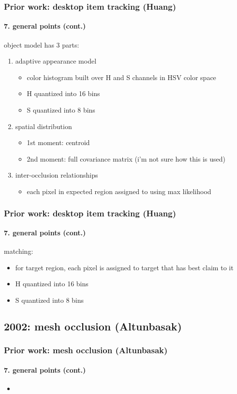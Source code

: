 \begin{frame}
\frametitle{Prior work: desktop item tracking (Huang)}
\framesubtitle{7. general points (cont.)}
\mypagenum
{}
	object model has 3 parts:
	\begin{enumerate}
		\item adaptive appearance model
			\begin{itemize}
				\item color histogram built over H and S channels in HSV color space
				\item H quantized into 16 bins
				\item S quantized into 8 bins
			\end{itemize}
		\item spatial distribution
			\begin{itemize}
				\item 1st moment: centroid
				\item 2nd moment: full covariance matrix (i'm not sure how this is used)
			\end{itemize}	
		\item inter-occlusion relationships
			\begin{itemize}
				\item each pixel in expected region assigned to  using max likelihood
			\end{itemize}	
	\end{enumerate}
\end{frame}




\begin{frame}
\frametitle{Prior work: desktop item tracking (Huang)}
\framesubtitle{7. general points (cont.)}
\mypagenum
{}
	matching:
	\begin{itemize}
		\item for target region, each pixel is assigned to target that has best claim to it
		\item H quantized into 16 bins
		\item S quantized into 8 bins
	\end{itemize}
\end{frame}


\subsection{2002: mesh occlusion (Altunbasak)}
\begin{frame}
\frametitle{Prior work: mesh occlusion (Altunbasak)}
\framesubtitle{7. general points (cont.)}
\mypagenum
{}
	\begin{itemize}
		\item 
	\end{itemize}
\end{frame}


